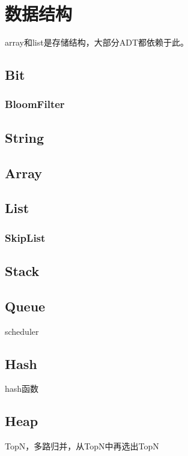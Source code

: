 \chapter{数据结构}

array和list是存储结构，大部分ADT都依赖于此。

\section{Bit}

\subsection{BloomFilter}

\section{String}

\section{Array}

\section{List}

\subsection{SkipList}

\section{Stack}

\section{Queue}

scheduler

\section{Hash}

hash函数

\section{Heap}

TopN，多路归并，从TopN中再选出TopN

